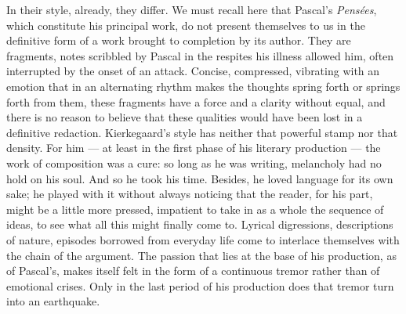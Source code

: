 \documentclass[12pt,a4paper]{article}
\newcommand{\opage}[1]{\marginnote{\footnotesize\textit{[#1]}}}
\begin{document}
In their style, already, they differ. We must recall here that Pascal's
\emph{Pensées}, which constitute his principal work, do not present themselves
to us in the definitive form of a work
\opage{223}brought to completion by its author. They are fragments, notes scribbled by
Pascal in the respites his illness allowed him, often interrupted by the onset
of an attack. Concise, compressed, vibrating with an emotion that in an
alternating rhythm makes the thoughts spring forth or springs forth from them,
these fragments have a force and a clarity without equal, and there is no
reason to believe that these qualities would have been lost in a definitive
redaction. Kierkegaard's style has neither that powerful stamp nor that
density. For him --- at least in the first phase of his literary production ---
the work of composition was a cure: so long as he was writing, melancholy had
no hold on his soul. And so he took his time. Besides, he loved language for
its own sake; he played with it without always noticing that the reader, for
his part, might be a little more pressed, impatient to take in as a whole the
sequence of ideas, to see what all this might finally come to. Lyrical
digressions, descriptions of nature, episodes borrowed from everyday life come
to interlace themselves with the chain of the argument. The passion that lies
at the base of his production, as of Pascal's, makes itself felt in the form of
a continuous tremor rather than of emotional crises. Only in the last period of
his production does that tremor turn into an earthquake.
\end{document}

